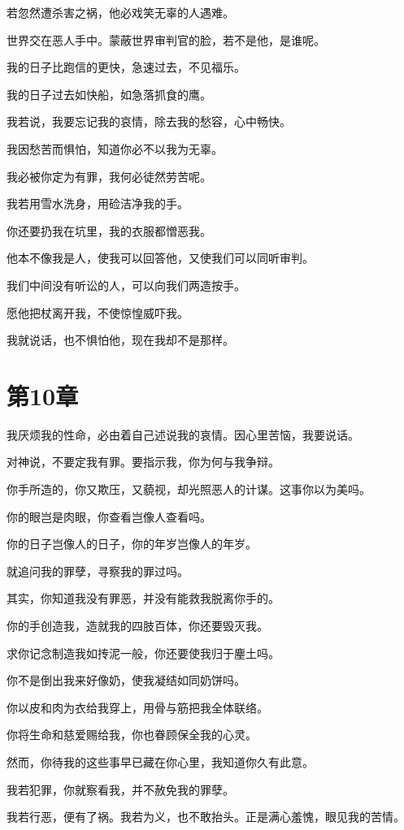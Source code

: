 \documentclass[12pt,oneside]{book}
\begin{document}
若忽然遭杀害之祸，他必戏笑无辜的人遇难。

世界交在恶人手中。蒙蔽世界审判官的脸，若不是他，是谁呢。

我的日子比跑信的更快，急速过去，不见福乐。

我的日子过去如快船，如急落抓食的鹰。

我若说，我要忘记我的哀情，除去我的愁容，心中畅快。

我因愁苦而惧怕，知道你必不以我为无辜。

我必被你定为有罪，我何必徒然劳苦呢。

我若用雪水洗身，用硷洁净我的手。

你还要扔我在坑里，我的衣服都憎恶我。

他本不像我是人，使我可以回答他，又使我们可以同听审判。

我们中间没有听讼的人，可以向我们两造按手。

愿他把杖离开我，不使惊惶威吓我。

我就说话，也不惧怕他，现在我却不是那样。



\chapter{第10章}
我厌烦我的性命，必由着自己述说我的哀情。因心里苦恼，我要说话。

对神说，不要定我有罪。要指示我，你为何与我争辩。

你手所造的，你又欺压，又藐视，却光照恶人的计谋。这事你以为美吗。

你的眼岂是肉眼，你查看岂像人查看吗。

你的日子岂像人的日子，你的年岁岂像人的年岁。

就追问我的罪孽，寻察我的罪过吗。

其实，你知道我没有罪恶，并没有能救我脱离你手的。

你的手创造我，造就我的四肢百体，你还要毁灭我。

求你记念制造我如抟泥一般，你还要使我归于麈土吗。

你不是倒出我来好像奶，使我凝结如同奶饼吗。

你以皮和肉为衣给我穿上，用骨与筋把我全体联络。

你将生命和慈爱赐给我，你也眷顾保全我的心灵。

然而，你待我的这些事早已藏在你心里，我知道你久有此意。

我若犯罪，你就察看我，并不赦免我的罪孽。

我若行恶，便有了祸。我若为义，也不敢抬头。正是满心羞愧，眼见我的苦情。
\end{document}
